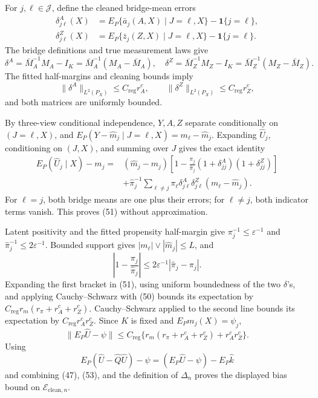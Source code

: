 For \(j,\ell\in\mathcal J\), define the cleaned bridge-mean errors
\[
\begin{aligned}
 \delta^A_{j\ell}(X)
 &=E_P\{\bar a_j(A,X)\mid J=\ell,X\}-\mathbf 1\{j=\ell\},\\
 \delta^Z_{j\ell}(X)
 &=E_P\{\bar z_j(Z,X)\mid J=\ell,X\}-\mathbf 1\{j=\ell\}.
\end{aligned} \tag{48}
\]
The bridge definitions and true measurement laws give
\[
 \delta^A=\bar M_A^{-1}M_A-I_K=\bar M_A^{-1}(M_A-\bar M_A),
 \quad
 \delta^Z=\bar M_Z^{-1}M_Z-I_K=\bar M_Z^{-1}(M_Z-\bar M_Z). \tag{49}
\]
The fitted half-margins and cleaning bounds imply
\[
 \|\delta^A\|_{L^2(P_X)}\leq C_{\mathrm{reg}}r_A^c,\qquad
 \|\delta^Z\|_{L^2(P_X)}\leq C_{\mathrm{reg}}r_Z^c, \tag{50}
\]
and both matrices are uniformly bounded.

By three-view conditional independence, \(Y,A,Z\) separate conditionally on \((J=\ell,X)\), and
\(E_P(Y-\widehat m_j\mid J=\ell,X)=m_\ell-\widehat m_j\).  Expanding \(\widehat U_j\), conditioning on \((J,X)\), and summing over \(J\) gives the exact identity
\[
\begin{aligned}
 E_P(\widehat U_j\mid X)-m_j
={}&(\widehat m_j-m_j)
 \left[1-\frac{\pi_j}{\widehat\pi_j}
 (1+\delta^A_{jj})(1+\delta^Z_{jj})\right]\\
&+\widehat\pi_j^{-1}\sum_{\ell\ne j}\pi_\ell
 \delta^A_{j\ell}\delta^Z_{j\ell}(m_\ell-\widehat m_j). \tag{51}
\end{aligned}
\]
For \(\ell=j\), both bridge means are one plus their errors; for \(\ell\ne j\), both indicator terms vanish.  This proves (51) without approximation.

Latent positivity and the fitted propensity half-margin give
\(\pi_j^{-1}\leq\varepsilon^{-1}\) and \(\widehat\pi_j^{-1}\leq2\varepsilon^{-1}\).  Bounded support gives \(|m_\ell|\vee|\widehat m_j|\leq L\), and
\[
 \left|1-\frac{\pi_j}{\widehat\pi_j}\right|
 \leq2\varepsilon^{-1}|\widehat\pi_j-\pi_j|. \tag{52}
\]
Expanding the first bracket in (51), using uniform boundedness of the two \(\delta\)'s, and applying Cauchy--Schwarz with (50) bounds its expectation by
\(C_{\mathrm{reg}}r_m(r_\pi+r_A^c+r_Z^c)\).  Cauchy--Schwarz applied to the second line bounds its expectation by \(C_{\mathrm{reg}}r_A^cr_Z^c\).  Since \(K\) is fixed and \(E_Pm_j(X)=\psi_j\),
\[
 \|E_P\widehat U-\psi\|
 \leq C_{\mathrm{reg}}
 \{r_m(r_\pi+r_A^c+r_Z^c)+r_A^cr_Z^c\}. \tag{53}
\]
Using
\[
E_P(\widehat U-\widehat Q\widehat U)-\psi
=(E_P\widehat U-\psi)-E_P\widehat k
\]
and combining (47), (53), and the definition of \(\Delta_n\) proves the displayed bias bound on \(\mathcal E_{\mathrm{clean},n}\).

